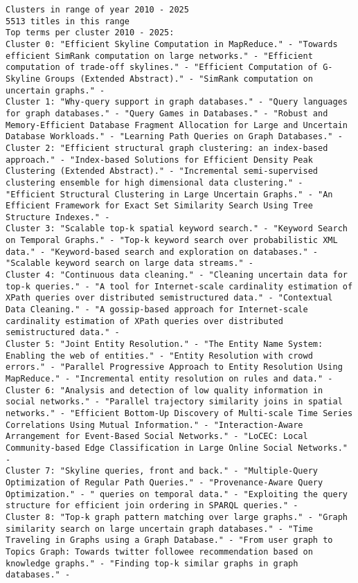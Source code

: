 \documentclass[11pt]{article}
\begin{document}
\begin{verbatim}
Clusters in range of year 2010 - 2025
5513 titles in this range
Top terms per cluster 2010 - 2025:
Cluster 0: "Efficient Skyline Computation in MapReduce." - "Towards efficient SimRank computation on large networks." - "Efficient computation of trade-off skylines." - "Efficient Computation of G-Skyline Groups (Extended Abstract)." - "SimRank computation on uncertain graphs." - 
Cluster 1: "Why-query support in graph databases." - "Query languages for graph databases." - "Query Games in Databases." - "Robust and Memory-Efficient Database Fragment Allocation for Large and Uncertain Database Workloads." - "Learning Path Queries on Graph Databases." - 
Cluster 2: "Efficient structural graph clustering: an index-based approach." - "Index-based Solutions for Efficient Density Peak Clustering (Extended Abstract)." - "Incremental semi-supervised clustering ensemble for high dimensional data clustering." - "Efficient Structural Clustering in Large Uncertain Graphs." - "An Efficient Framework for Exact Set Similarity Search Using Tree Structure Indexes." - 
Cluster 3: "Scalable top-k spatial keyword search." - "Keyword Search on Temporal Graphs." - "Top-k keyword search over probabilistic XML data." - "Keyword-based search and exploration on databases." - "Scalable keyword search on large data streams." - 
Cluster 4: "Continuous data cleaning." - "Cleaning uncertain data for top-k queries." - "A tool for Internet-scale cardinality estimation of XPath queries over distributed semistructured data." - "Contextual Data Cleaning." - "A gossip-based approach for Internet-scale cardinality estimation of XPath queries over distributed semistructured data." - 
Cluster 5: "Joint Entity Resolution." - "The Entity Name System: Enabling the web of entities." - "Entity Resolution with crowd errors." - "Parallel Progressive Approach to Entity Resolution Using MapReduce." - "Incremental entity resolution on rules and data." - 
Cluster 6: "Analysis and detection of low quality information in social networks." - "Parallel trajectory similarity joins in spatial networks." - "Efficient Bottom-Up Discovery of Multi-scale Time Series Correlations Using Mutual Information." - "Interaction-Aware Arrangement for Event-Based Social Networks." - "LoCEC: Local Community-based Edge Classification in Large Online Social Networks." - 
Cluster 7: "Skyline queries, front and back." - "Multiple-Query Optimization of Regular Path Queries." - "Provenance-Aware Query Optimization." - " queries on temporal data." - "Exploiting the query structure for efficient join ordering in SPARQL queries." - 
Cluster 8: "Top-k graph pattern matching over large graphs." - "Graph similarity search on large uncertain graph databases." - "Time Traveling in Graphs using a Graph Database." - "From user graph to Topics Graph: Towards twitter followee recommendation based on knowledge graphs." - "Finding top-k similar graphs in graph databases." - 

\end{verbatim}
\end{document}
